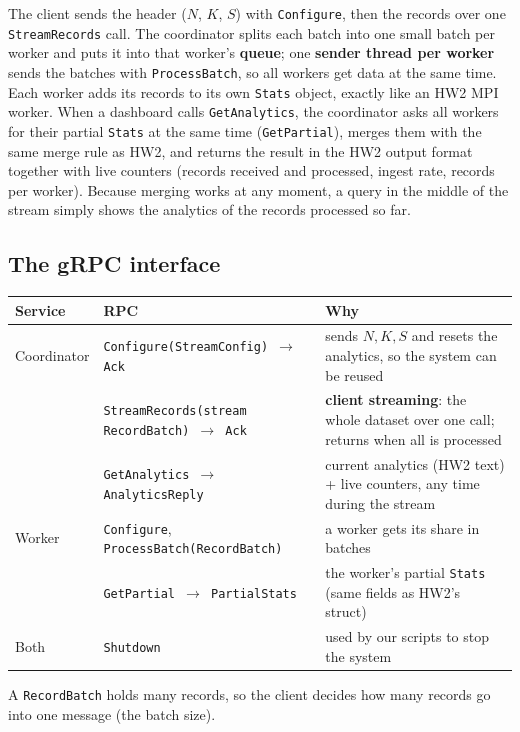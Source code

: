 \documentclass[10pt,a4paper]{article}
\newcommand{\code}[1]{\texttt{#1}}
\begin{document}
The client sends the header ($N$, $K$, $S$) with \code{Configure}, then the records over one \code{StreamRecords} call. The
coordinator splits each batch into one small batch per worker and puts it into that worker's \textbf{queue}; one \textbf{sender
thread per worker} sends the batches with \code{ProcessBatch}, so all workers get data at the same time. Each worker adds its
records to its own \code{Stats} object, exactly like an HW2 MPI worker. When a dashboard calls \code{GetAnalytics}, the
coordinator asks all workers for their partial \code{Stats} at the same time (\code{GetPartial}), merges them with the same
merge rule as HW2, and returns the result in the HW2 output format together with live counters (records received and
processed, ingest rate, records per worker). Because merging works at any moment, a query in the middle of the stream
simply shows the analytics of the records processed so far.

\subsection{The gRPC interface}
\begin{center}\small
\begin{tabularx}{\textwidth}{>{\raggedright\arraybackslash}p{1.8cm}>{\raggedright\arraybackslash}p{6.3cm}>{\raggedright\arraybackslash}X}
\toprule
Service & RPC & Why \\
\midrule
Coordinator & \code{Configure(StreamConfig) $\to$ Ack} & sends $N,K,S$ and resets the analytics, so the system can be reused \\
            & \code{StreamRecords(stream RecordBatch) $\to$ Ack} & \textbf{client streaming}: the whole dataset over one call; returns when all is processed \\
            & \code{GetAnalytics $\to$ AnalyticsReply} & current analytics (HW2 text) + live counters, any time during the stream \\
Worker      & \code{Configure}, \code{ProcessBatch(RecordBatch)} & a worker gets its share in batches \\
            & \code{GetPartial $\to$ PartialStats} & the worker's partial \code{Stats} (same fields as HW2's struct) \\
Both        & \code{Shutdown} & used by our scripts to stop the system \\
\bottomrule
\end{tabularx}
\end{center}
A \code{RecordBatch} holds many records, so the client decides how many records go into one message (the batch size).
\end{document}
